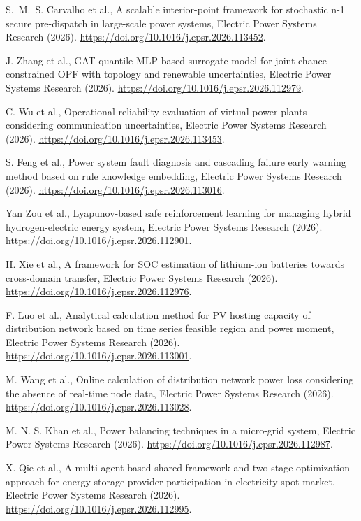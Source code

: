 ﻿
S.~M.~S. Carvalho et al., A scalable interior-point framework for stochastic
  n-1 secure pre-dispatch in large-scale power systems, Electric Power Systems
  Research (2026).
\url{https://doi.org/10.1016/j.epsr.2026.113452}.

J. Zhang et al., GAT-quantile-MLP-based surrogate model for joint
  chance-constrained OPF with topology and renewable uncertainties, Electric
  Power Systems Research (2026).
\url{https://doi.org/10.1016/j.epsr.2026.112979}.

C. Wu et al., Operational reliability evaluation of virtual power plants
  considering communication uncertainties, Electric Power Systems Research
  (2026).
\url{https://doi.org/10.1016/j.epsr.2026.113453}.

S. Feng et al., Power system fault diagnosis and cascading failure early
  warning method based on rule knowledge embedding, Electric Power Systems
  Research (2026).
\url{https://doi.org/10.1016/j.epsr.2026.113016}.

Yan Zou et al., Lyapunov-based safe reinforcement learning for managing hybrid
  hydrogen-electric energy system, Electric Power Systems Research (2026).
\url{https://doi.org/10.1016/j.epsr.2026.112901}.

H. Xie et al., A framework for SOC estimation of lithium-ion batteries towards
  cross-domain transfer, Electric Power Systems Research (2026).
\url{https://doi.org/10.1016/j.epsr.2026.112976}.

F. Luo et al., Analytical calculation method for PV hosting capacity of
  distribution network based on time series feasible region and power moment,
  Electric Power Systems Research (2026).
\url{https://doi.org/10.1016/j.epsr.2026.113001}.

M. Wang et al., Online calculation of distribution network power loss
  considering the absence of real-time node data, Electric Power Systems
  Research (2026).
\url{https://doi.org/10.1016/j.epsr.2026.113028}.

M. N. S. Khan et al., Power balancing techniques in a micro-grid system,
  Electric Power Systems Research (2026).
\url{https://doi.org/10.1016/j.epsr.2026.112987}.

X. Qie et al., A multi-agent-based shared framework and two-stage optimization
  approach for energy storage provider participation in electricity spot
  market, Electric Power Systems Research (2026).
\url{https://doi.org/10.1016/j.epsr.2026.112995}.

